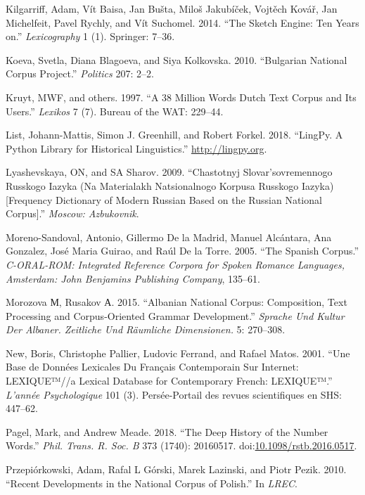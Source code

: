 \documentclass[]{article}
\begin{document}
\hypertarget{ref-kilgarriff2014sketch}{}
Kilgarriff, Adam, Vít Baisa, Jan Bušta, Miloš Jakubíček, Vojtěch Kovář,
Jan Michelfeit, Pavel Rychly, and Vít Suchomel. 2014. ``The Sketch
Engine: Ten Years on.'' \emph{Lexicography} 1 (1). Springer: 7--36.

\hypertarget{ref-koeva2010bulgarian}{}
Koeva, Svetla, Diana Blagoeva, and Siya Kolkovska. 2010. ``Bulgarian
National Corpus Project.'' \emph{Politics} 207: 2--2.

\hypertarget{ref-kruyt199738}{}
Kruyt, MWF, and others. 1997. ``A 38 Million Words Dutch Text Corpus and
Its Users.'' \emph{Lexikos} 7 (7). Bureau of the WAT: 229--44.

\hypertarget{ref-list_lingpy._2018}{}
List, Johann-Mattis, Simon J. Greenhill, and Robert Forkel. 2018.
``LingPy. A Python Library for Historical Linguistics.''
\url{http://lingpy.org}.

\hypertarget{ref-lyashevskaya2009chastotnyj}{}
Lyashevskaya, ON, and SA Sharov. 2009. ``Chastotnyj Slovar'sovremennogo
Russkogo Iazyka (Na Materialakh Natsionalnogo Korpusa Russkogo
Iazyka){[}Frequency Dictionary of Modern Russian Based on the Russian
National Corpus{]}.'' \emph{Moscow: Azbukovnik}.

\hypertarget{ref-moreno2005spanish}{}
Moreno-Sandoval, Antonio, Gillermo De la Madrid, Manuel Alcántara, Ana
Gonzalez, José Maria Guirao, and Raúl De la Torre. 2005. ``The Spanish
Corpus.'' \emph{C-ORAL-ROM: Integrated Reference Corpora for Spoken
Romance Languages, Amsterdam: John Benjamins Publishing Company},
135--61.

\hypertarget{ref-morozova2015albanian}{}
Morozova М, Rusakov А. 2015. ``Albanian National Corpus: Composition,
Text Processing and Corpus-Oriented Grammar Development.'' \emph{Sprache
Und Kultur Der Albaner. Zeitliche Und Räumliche Dimensionen.} 5:
270--308.

\hypertarget{ref-new2001base}{}
New, Boris, Christophe Pallier, Ludovic Ferrand, and Rafael Matos. 2001.
``Une Base de Données Lexicales Du Français Contemporain Sur Internet:
LEXIQUE™//a Lexical Database for Contemporary French: LEXIQUE™.''
\emph{L'année Psychologique} 101 (3). Persée-Portail des revues
scientifiques en SHS: 447--62.

\hypertarget{ref-pagel_deep_2018}{}
Pagel, Mark, and Andrew Meade. 2018. ``The Deep History of the Number
Words.'' \emph{Phil. Trans. R. Soc. B} 373 (1740): 20160517.
doi:\href{https://doi.org/10.1098/rstb.2016.0517}{10.1098/rstb.2016.0517}.

\hypertarget{ref-przepiorkowski2010recent}{}
Przepiórkowski, Adam, Rafal L Górski, Marek Lazinski, and Piotr Pezik.
2010. ``Recent Developments in the National Corpus of Polish.'' In
\emph{LREC}.
\end{document}

